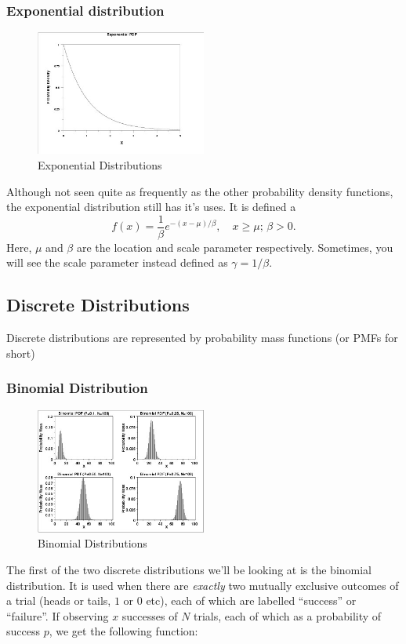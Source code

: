 \documentclass{article}
\begin{document}
\subsubsection{Exponential distribution}
\begin{figure}[H]
\centering
\includegraphics[width=0.5\textwidth]{images/exp_pdf.jpg}
\caption{Exponential Distributions} \label{fig:exp_dis}
\end{figure}
Although not seen quite as frequently as the other probability density functions, the exponential distribution still has it's uses. It is defined a
\begin{equation}
    f(x) = \frac{1}{\beta} e^{-(x-\mu)/\beta},\quad x\geq\mu;\,\beta>0.
\end{equation}
Here, $\mu$ and $\beta$ are the location and scale parameter respectively. Sometimes, you will see the scale parameter instead defined as $\gamma = 1/\beta$. 

\subsection{Discrete Distributions}
Discrete distributions are represented by probability mass functions (or PMFs for short)
\subsubsection{Binomial Distribution}
\begin{figure}[H]
\centering
\includegraphics[width=0.5\textwidth]{images/binomial.jpg}
\caption{Binomial Distributions} \label{fig:bi_dis}
\end{figure}
The first of the two discrete distributions we'll be looking at is the binomial distribution. It is used when there are \textit{exactly} two mutually exclusive outcomes of a trial (heads or tails, $1$ or $0$ etc), each of which are labelled ``success'' or ``failure''. If observing $x$ successes of $N$ trials, each of which as a probability of success $p$, we get the following function:
\end{document}
